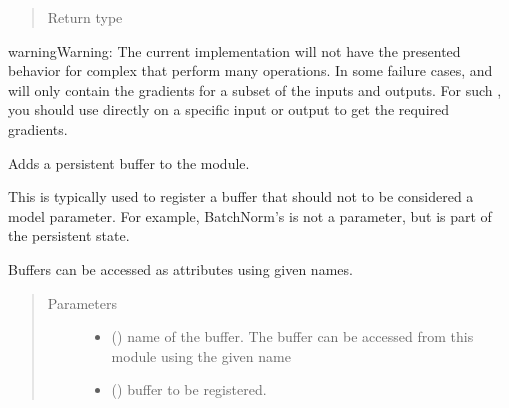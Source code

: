 \documentclass[letterpaper,10pt,english]{sphinxmanual}
\begin{document}
\begin{fulllineitems}
\begin{fulllineitems}
\begin{quote}
\begin{description}
\item[{Return type}] \leavevmode
{}

\end{description}\end{quote}

\begin{sphinxadmonition}{warning}{Warning:}
The current implementation will not have the presented behavior
for complex  that perform many operations.
In some failure cases,  and  will only
contain the gradients for a subset of the inputs and outputs.
For such , you should use 
directly on a specific input or output to get the required gradients.
\end{sphinxadmonition}

\end{fulllineitems}


\begin{fulllineitems}
\label{\detokenize{api/dynamics:geology.metamodelling.dynamics.LatentSpaceDynamics.register_buffer}}
Adds a persistent buffer to the module.

This is typically used to register a buffer that should not to be
considered a model parameter. For example, BatchNorm’s 
is not a parameter, but is part of the persistent state.

Buffers can be accessed as attributes using given names.
\begin{quote}\begin{description}
\item[{Parameters}] \leavevmode\begin{itemize}
\item {} 
 () \textendash{} name of the buffer. The buffer can be accessed
from this module using the given name

\item {} 
 () \textendash{} buffer to be registered.


\end{itemize}
\end{description}
\end{quote}
\end{fulllineitems}
\end{fulllineitems}
\end{document}
